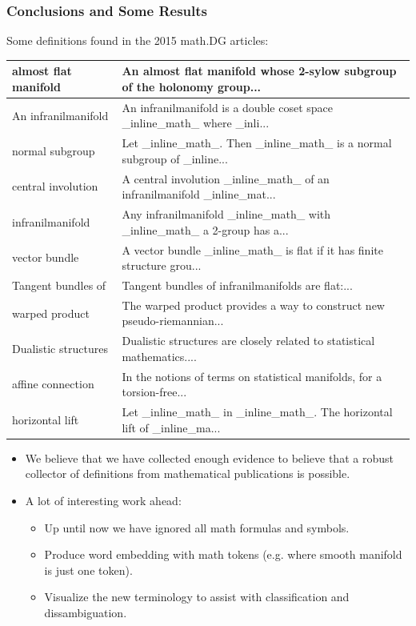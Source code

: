 \documentclass{beamer}
\begin{document}
\begin{frame} 
    \frametitle{Conclusions and Some Results}
    Some definitions found in the 2015 math.DG articles:
    {\tiny\begin{tabular}{|l|l|}
        \hline
        almost flat manifold  &   An almost flat manifold whose 2-sylow subgroup of the holonomy group...\\
        \hline
        An infranilmanifold  &   An infranilmanifold is a double coset space \_inline\_math\_ where \_inli...\\
        \hline
        normal subgroup  &   Let \_inline\_math\_. Then \_inline\_math\_ is a normal subgroup of \_inline...\\
        \hline
        central involution  &   A central involution \_inline\_math\_ of an infranilmanifold \_inline\_mat...\\
        \hline
        infranilmanifold  &   Any infranilmanifold \_inline\_math\_ with \_inline\_math\_ a 2-group has a...\\
        \hline
        vector bundle  &   A vector bundle \_inline\_math\_ is flat if it has finite structure grou...\\
        \hline
        Tangent bundles of  &   Tangent bundles of infranilmanifolds are flat:...\\
        \hline
        warped product  &   The warped product provides a way to construct new pseudo-riemannian...\\
        \hline
        Dualistic structures  &   Dualistic structures are closely related to statistical mathematics....\\
        \hline
        affine connection  &   In the notions of terms on statistical manifolds, for a torsion-free...\\
        \hline
        horizontal lift  &   Let \_inline\_math\_ in \_inline\_math\_. The horizontal lift of \_inline\_ma...\\
        \hline
    \end{tabular}}
    \begin{itemize}
            \item We believe that we have collected enough evidence to believe that a robust collector of definitions from mathematical publications is possible.
            \item A lot of interesting work ahead:
                \begin{itemize}
                    \item Up until now we have ignored all math formulas and symbols.
                    \item Produce word embedding with math tokens (e.g. where smooth manifold is just one token).
                        \item Visualize the new terminology to assist with classification and dissambiguation.
                \end{itemize}
    \end{itemize}
\end{frame}
\begin{frame}
\titlepage
\end{frame}
\end{document}
